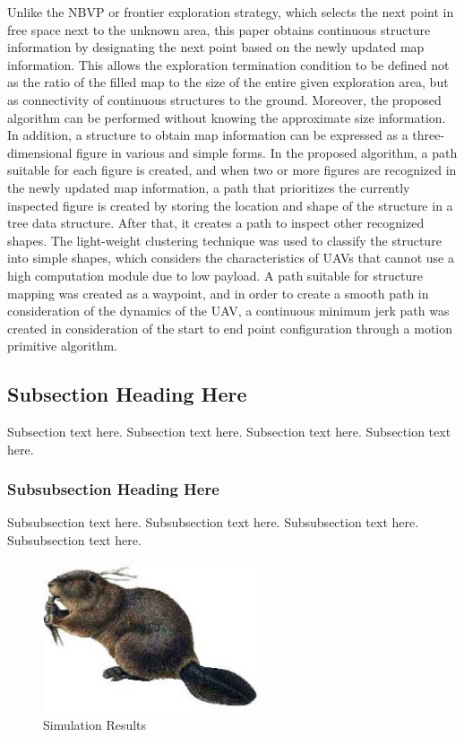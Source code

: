 \documentclass[conference,onecolumn]{IEEEtran} %
\begin{document}
Unlike the NBVP or frontier exploration strategy, which selects the next point in free space next to the unknown area, this paper obtains continuous structure information by designating the next point based on the newly updated map information. This allows the exploration termination condition to be defined not as the ratio of the filled map to the size of the entire given exploration area, but as connectivity of continuous structures to the ground. Moreover, the proposed algorithm can be performed without knowing the approximate size information. In addition, a structure to obtain map information can be expressed as a three-dimensional figure in various and simple forms. In the proposed algorithm, a path suitable for each figure is created, and when two or more figures are recognized in the newly updated map information, a path that prioritizes the currently inspected figure is created by storing the location and shape of the structure in a tree data structure. After that, it creates a path to inspect other recognized shapes. The light-weight clustering technique was used to classify the structure into simple shapes, which considers the characteristics of UAVs that cannot use a high computation module due to low payload. A path suitable for structure mapping was created as a waypoint, and in order to create a smooth path in consideration of the dynamics of the UAV, a continuous minimum jerk path was created in consideration of the start to end point configuration through a motion primitive algorithm.

\subsection{Subsection Heading Here}
Subsection text here. Subsection text here. Subsection text here. Subsection text here.


\subsubsection{Subsubsection Heading Here}
Subsubsection text here. Subsubsection text here. Subsubsection text here. Subsubsection text here.

\begin{figure}[!h]
  \centering
    \includegraphics[width=2.5in]{beaver.jpg}
  \caption{Simulation Results}
  \label{figlabel}
\end{figure}
\end{document}
